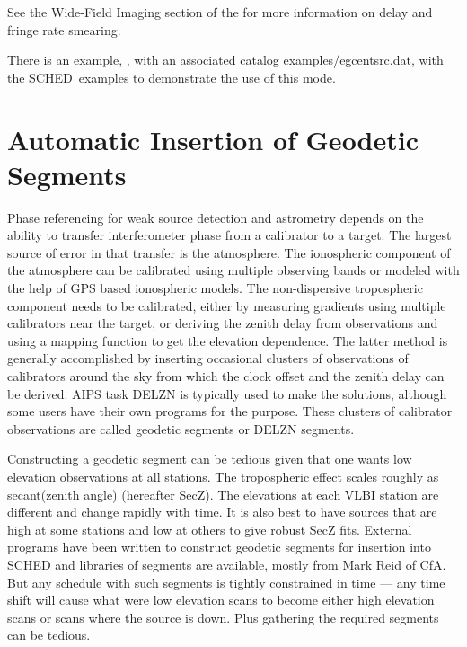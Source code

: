 \documentclass{report}
\newcommand{\schedb}{{\sc SCHED~}}
\begin{document}
See the Wide-Field Imaging section of the
 for more
information on delay and fringe rate smearing.


There is an example, , with an
associated catalog 
{examples/egcentsrc.dat}, with the \schedb examples to
demonstrate the use of this mode.

\section{\label{SEC:GEOSEG}Automatic Insertion of Geodetic Segments}

Phase referencing for weak source detection and astrometry depends on
the ability to transfer interferometer phase from a calibrator to a
target.  The largest source of error in that transfer is the
atmosphere.  The ionospheric component of the atmosphere can be
calibrated using multiple observing bands or modeled with the help of
GPS based ionospheric models.  The non-dispersive tropospheric
component needs to be calibrated, either by measuring gradients using
multiple calibrators near the target, or deriving the zenith delay
from observations and using a mapping function to get the elevation
dependence.  The latter method is generally accomplished by inserting
occasional clusters of observations of calibrators around the sky from
which the clock offset and the zenith delay can be derived.  AIPS task
DELZN is typically used to make the solutions, although some users
have their own programs for the purpose.  These clusters of calibrator
observations are called geodetic segments or DELZN segments.

Constructing a geodetic segment can be tedious given that one wants
low elevation observations at all stations.  The tropospheric effect
scales roughly as secant(zenith angle) (hereafter SecZ).  The
elevations at each VLBI station are different and change rapidly with
time.  It is also best to have sources that are high at some stations
and low at others to give robust SecZ fits.  External programs have
been written to construct geodetic segments for insertion into SCHED and
libraries of segments are available, mostly from Mark Reid of CfA.
But any schedule with such segments is tightly constrained in time ---
any time shift will cause what were low elevation scans to become
either high elevation scans or scans where the source is down.  Plus
gathering the required segments can be tedious.
\end{document}
